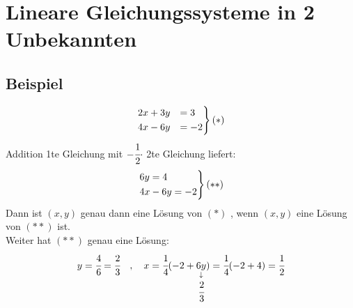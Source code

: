 
\newcommand{\fach}{Lineare Algebra \RM{1}.}
\newcommand{\semester}{WiSe 2012}
\newcommand{\homepage}{http://wwwmath.uni-muenster.de/reine/u/topos/lehre/WS2012-2013/LineareAlgebra1/}
\newcommand{\prof}{Prof.\ Dr.\ Arthur Bartels}




\maketitle
\begin{abstract}

\section*{Hinweis}
Verglichen mit den neueren Mitschriften ist dieses Skript in einem deutlich schlechteren Zustand, hauptsächlich in technischer Hinsicht, aber auch die inhaltliche 
Fehlersuche war bei weitem nicht so intensiv \ldots damals hatte ich gerade erst angefangen  mich mit \LaTeX{}  zu beschäftigen.

Ich plane nicht, daran in näherer Zukunft etwas zu verändern, da dies ziemlich viel Zeit in Anspruch nehmen würde, die 
anderweitig besser investiert ist. Sollte jemand Lust dazu haben, wäre die wichtigste Baustelle das Inhaltsverzeichnis, in dem kurze Beschreibungen der Sätze, Lemmata, etc.
fehlen. Außerdem müssen die Labels eindeutig werden. Wie man dies handhaben kann, sieht man gut in den Dateien der späteren Semester.
\end{abstract}

\tableofcontents
\cleardoubleoddemptypage
{}
\setcounter{page}{1}
\setcounter{footnote}{0}

\section{Lineare Gleichungssysteme in 2 Unbekannten} 
\subsection{Beispiel}
\[
\begin{rcases}
2x+3y &= 3 \\
4x-6y &= -2
\end{rcases}
(*)
\]
Addition 1te Gleichung mit \( - \cfrac{1}{2} \cdot \) 2te Gleichung liefert:
\[
\begin{rcases}
6y =4 \\
4x-6y=-2
\end{rcases}
(**)
\]
Dann ist \( (x,y) \) genau dann eine Lösung von \( (*) \) , wenn \( (x,y) \)  eine Lösung von \( (**) \) ist. \\
Weiter hat \( (**) \) genau eine Lösung:
\[
y= \cfrac{4}{6} = \cfrac{2}{3} \quad , \quad x= \cfrac{1}{4} (-2+ \underset{ \underset{ \cfrac{2}{3}}{\downarrow} }{6y}) = \cfrac{1}{4} (-2+4) = \cfrac{1}{2}
\]
